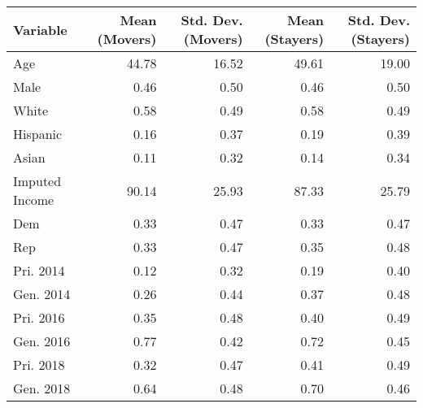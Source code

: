 \begin{tabular}{lrrrr}
  \toprule
Variable & Mean (Movers) & Std. Dev. (Movers) & Mean (Stayers) & Std. Dev. (Stayers) \\ 
  \midrule
Age & 44.78 & 16.52 & 49.61 & 19.00 \\ 
  Male & 0.46 & 0.50 & 0.46 & 0.50 \\ 
  White & 0.58 & 0.49 & 0.58 & 0.49 \\ 
  Hispanic & 0.16 & 0.37 & 0.19 & 0.39 \\ 
  Asian & 0.11 & 0.32 & 0.14 & 0.34 \\ 
  Imputed Income & 90.14 & 25.93 & 87.33 & 25.79 \\ 
  Dem & 0.33 & 0.47 & 0.33 & 0.47 \\ 
  Rep & 0.33 & 0.47 & 0.35 & 0.48 \\ 
  Pri. 2014 & 0.12 & 0.32 & 0.19 & 0.40 \\ 
  Gen. 2014 & 0.26 & 0.44 & 0.37 & 0.48 \\ 
  Pri. 2016 & 0.35 & 0.48 & 0.40 & 0.49 \\ 
  Gen. 2016 & 0.77 & 0.42 & 0.72 & 0.45 \\ 
  Pri. 2018 & 0.32 & 0.47 & 0.41 & 0.49 \\ 
  Gen. 2018 & 0.64 & 0.48 & 0.70 & 0.46 \\ 
   \bottomrule
\end{tabular}
